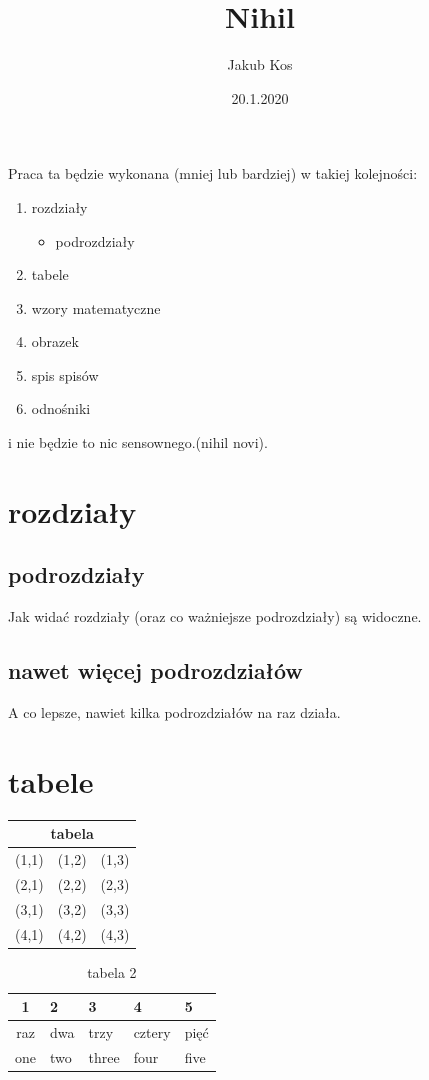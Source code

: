 \documentclass[11pt]{article}
\title{Nihil}
\author{Jakub Kos}
\date{20.1.2020}
\begin{document}
\maketitle
\newpage
Praca ta będzie wykonana (mniej lub bardziej) w takiej kolejności:
\begin{enumerate}
\item rozdziały
\begin{itemize}
\item podrozdziały
\end{itemize}
\item tabele
\item wzory matematyczne
\item obrazek
\item spis spisów
\item odnośniki
\end{enumerate}
i nie będzie to nic sensownego.(nihil novi)\cite{lac}.
\newpage
\section{rozdziały}
\subsection{podrozdziały}
Jak widać rozdziały (oraz co ważniejsze podrozdziały) są widoczne.
\subsection{nawet więcej podrozdziałów}
A co lepsze, nawiet kilka podrozdziałów na raz działa.
\newpage
\section{tabele}
\begin{tabular}{||l|c|r||} 
\hline
\multicolumn{3}{||c||}{tabela}
\\ \hline
(1,1) & (1,2) & (1,3)\\
(2,1) & (2,2) & (2,3)\\ \hline
(3,1) & (3,2) & (3,3)\\
(4,1) & (4,2) & (4,3)\\ \hline
\end{tabular}

\begin{table}[h]
\caption{tabela 2}
\label{tab:tabela 2}
\begin{center}
\begin{tabular}{|c|l|l|l|l|}
\hline 1 & 2 & 3 & 4 & 5 \\ \hline \hline \hline
raz & dwa & trzy & cztery & pięć \\ \hline
one & two & three & four & five \\ \hline
\end{tabular}
\end{center}
\end{table}
\end{document}
